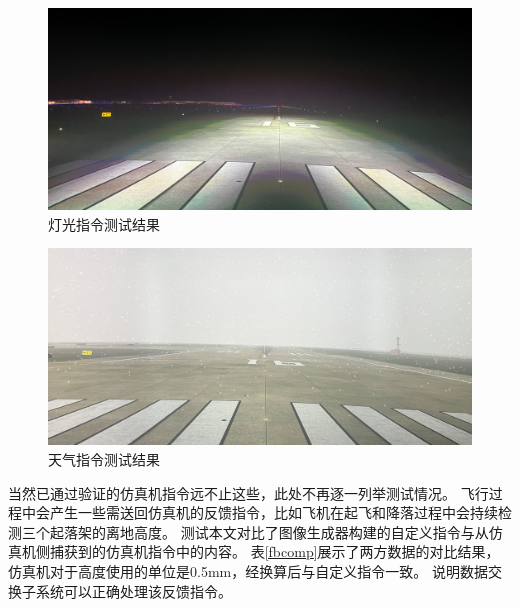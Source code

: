 \clearpage
\begin{figure}[h!]
    \begin{center}
        \includegraphics[width=.9\textwidth]{pictures/lighttest.jpg}
        \caption{灯光指令测试结果}
        \label{lighttest}
    \end{center}
\end{figure}
\begin{figure}[h!]
    \begin{center}
        \includegraphics[width=.9\textwidth]{pictures/snowtest.jpg}
        \caption{天气指令测试结果}
        \label{snowtest}
    \end{center}
\end{figure}
\par
当然已通过验证的仿真机指令远不止这些，此处不再逐一列举测试情况。
飞行过程中会产生一些需送回仿真机的反馈指令，比如飞机在起飞和降落过程中会持续检测三个起落架的离地高度。
测试本文对比了图像生成器构建的自定义指令与从仿真机侧捕获到的仿真机指令中的内容。
表\ref{fbcomp}展示了两方数据的对比结果，仿真机对于高度使用的单位是0.5mm，经换算后与自定义指令一致。
说明数据交换子系统可以正确处理该反馈指令。
